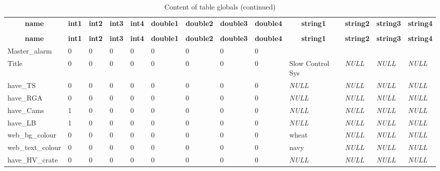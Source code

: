 %
%
 \begin{longtable}{|l|l|l|l|l|l|l|l|l|l|l|l|l|} 
 \hline \endhead \hline \endfoot \hline 
 \caption{Content of table globals} \label{tab:globals-data} \\\hline \multicolumn{1}{|c|}{\textbf{name}} & \multicolumn{1}{|c|}{\textbf{int1}} & \multicolumn{1}{|c|}{\textbf{int2}} & \multicolumn{1}{|c|}{\textbf{int3}} & \multicolumn{1}{|c|}{\textbf{int4}} & \multicolumn{1}{|c|}{\textbf{double1}} & \multicolumn{1}{|c|}{\textbf{double2}} & \multicolumn{1}{|c|}{\textbf{double3}} & \multicolumn{1}{|c|}{\textbf{double4}} & \multicolumn{1}{|c|}{\textbf{string1}} & \multicolumn{1}{|c|}{\textbf{string2}} & \multicolumn{1}{|c|}{\textbf{string3}} & \multicolumn{1}{|c|}{\textbf{string4}} \\ \hline \hline  \endfirsthead 
\caption{Content of table globals (continued)} \\ \hline \multicolumn{1}{|c|}{\textbf{name}} & \multicolumn{1}{|c|}{\textbf{int1}} & \multicolumn{1}{|c|}{\textbf{int2}} & \multicolumn{1}{|c|}{\textbf{int3}} & \multicolumn{1}{|c|}{\textbf{int4}} & \multicolumn{1}{|c|}{\textbf{double1}} & \multicolumn{1}{|c|}{\textbf{double2}} & \multicolumn{1}{|c|}{\textbf{double3}} & \multicolumn{1}{|c|}{\textbf{double4}} & \multicolumn{1}{|c|}{\textbf{string1}} & \multicolumn{1}{|c|}{\textbf{string2}} & \multicolumn{1}{|c|}{\textbf{string3}} & \multicolumn{1}{|c|}{\textbf{string4}} \\ \hline \hline \endhead \endfoot
Master\_alarm & 0 & 0 & 0 & 0 & 0 & 0 & 0 & 0 &  &  &  &  \\ \hline 
Title & 0 & 0 & 0 & 0 & 0 & 0 & 0 & 0 & Slow Control Sys & \textit{NULL} & \textit{NULL} & \textit{NULL} \\ \hline 
have\_TS & 0 & 0 & 0 & 0 & 0 & 0 & 0 & 0 & \textit{NULL} & \textit{NULL} & \textit{NULL} & \textit{NULL} \\ \hline 
have\_RGA & 0 & 0 & 0 & 0 & 0 & 0 & 0 & 0 & \textit{NULL} & \textit{NULL} & \textit{NULL} & \textit{NULL} \\ \hline 
have\_Cams & 1 & 0 & 0 & 0 & 0 & 0 & 0 & 0 & \textit{NULL} & \textit{NULL} & \textit{NULL} & \textit{NULL} \\ \hline 
have\_LB & 1 & 0 & 0 & 0 & 0 & 0 & 0 & 0 & \textit{NULL} & \textit{NULL} & \textit{NULL} & \textit{NULL} \\ \hline 
web\_bg\_colour & 0 & 0 & 0 & 0 & 0 & 0 & 0 & 0 & wheat & \textit{NULL} & \textit{NULL} & \textit{NULL} \\ \hline 
web\_text\_colour & 0 & 0 & 0 & 0 & 0 & 0 & 0 & 0 & navy & \textit{NULL} & \textit{NULL} & \textit{NULL} \\ \hline 
have\_HV\_crate & 0 & 0 & 0 & 0 & 0 & 0 & 0 & 0 & \textit{NULL} & \textit{NULL} & \textit{NULL} & \textit{NULL} \\ \hline 
 \end{longtable}


